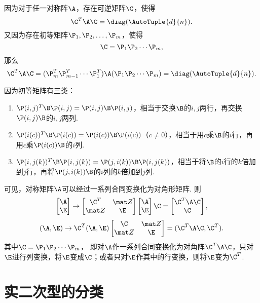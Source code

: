 \begin{theorem}
因为对于任一对称阵\(\A\)，存在可逆矩阵\(\C\)，使得\[
\C^T\A\C=\diag(\AutoTuple{d}{n}).
\]
又因为存在初等矩阵\(\P_1,\P_2,\dotsc,\P_m\)，使得\[
\C=\P_1\P_2\dotsm\P_m,
\]那么\[
\C^T\A\C = (\P_m^T\P_{m-1}^T\dotsm\P_1^T)\A(\P_1\P_2\dotsm\P_m)=\diag(\AutoTuple{d}{n}).
\]

因为初等矩阵有三类：
\begin{enumerate}
\item \(\P(i,j)^T\B\P(i,j)=\P(i,j)\B\P(i,j)\)，相当于交换\(\B\)的\(i,j\)两行，再交换\(\P(i,j)\B\)的\(i,j\)两列.
\item \(\P(i(c))^T\B\P(i(c))=\P(i(c))\B\P(i(c))\)（\(c \neq 0\)），相当于用\(c\)乘\(\B\)的\(i\)行，再用\(c\)乘\(\P(i(c))\B\)的\(i\)列.
\item \(\P(i,j(k))^T\B\P(i,j(k))=\P(j,i(k))\B\P(i,j(k))\)，相当于将\(\B\)的\(i\)行的\(k\)倍加到\(j\)行，再将\(\P(j,i(k))\B\)的\(i\)列的\(k\)倍加到\(j\)列.
\end{enumerate}
可见，对称矩阵\(\A\)可以经过一系列合同变换化为对角形矩阵.
则\[
\begin{bmatrix} \A \\ \E \end{bmatrix}
\to
\begin{bmatrix} \C^T & \z \\ \z & \E \end{bmatrix}
\begin{bmatrix} \A \\ \E \end{bmatrix}
\C = \begin{bmatrix} \C^T\A\C \\ \C \end{bmatrix},
\]\[
(\A,\E)
\to
\C^T (\A,\E) \begin{bmatrix}
\C & \z \\
\z & \E
\end{bmatrix}
= (\C^T\A\C,\C^T).
\]其中\(\C=\P_1\P_2\dotsm\P_m\)，%
即对\(\A\)作一系列合同变换化为对角阵\(\C^T\A\C\)，只对\(\E\)进行列变换，将\(\E\)变成\(\C\)；或者只对\(\E\)作其中的行变换，则将\(\E\)变为\(\C^T\).
\end{theorem}

\section{实二次型的分类}
